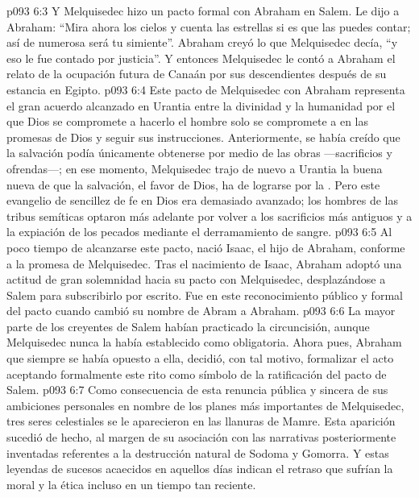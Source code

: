 \vs p093 6:3 Y Melquisedec hizo un pacto formal con Abraham en Salem. Le dijo a Abraham: “Mira ahora los cielos y cuenta las estrellas si es que las puedes contar; así de numerosa será tu simiente”. Abraham creyó lo que Melquisedec decía, “y eso le fue contado por justicia”. Y entonces Melquisedec le contó a Abraham el relato de la ocupación futura de Canaán por sus descendientes después de su estancia en Egipto.
\vs p093 6:4 \pc Este pacto de Melquisedec con Abraham representa el gran acuerdo alcanzado en Urantia entre la divinidad y la humanidad por el que Dios se compromete a hacerlo  el hombre solo se compromete a  en las promesas de Dios y seguir sus instrucciones. Anteriormente, se había creído que la salvación podía únicamente obtenerse por medio de las obras ---sacrificios y ofrendas---; en ese momento, Melquisedec trajo de nuevo a Urantia la buena nueva de que la salvación, el favor de Dios, ha de lograrse por la . Pero este evangelio de sencillez de fe en Dios era demasiado avanzado; los hombres de las tribus semíticas optaron más adelante por volver a los sacrificios más antiguos y a la expiación de los pecados mediante el derramamiento de sangre.
\vs p093 6:5 Al poco tiempo de alcanzarse este pacto, nació Isaac, el hijo de Abraham, conforme a la promesa de Melquisedec. Tras el nacimiento de Isaac, Abraham adoptó una actitud de gran solemnidad hacia su pacto con Melquisedec, desplazándose a Salem para subscribirlo por escrito. Fue en este reconocimiento público y formal del pacto cuando cambió su nombre de Abram a Abraham.
\vs p093 6:6 La mayor parte de los creyentes de Salem habían practicado la circuncisión, aunque Melquisedec nunca la había establecido como obligatoria. Ahora pues, Abraham que siempre se había opuesto a ella, decidió, con tal motivo, formalizar el acto aceptando formalmente este rito como símbolo de la ratificación del pacto de Salem.
\vs p093 6:7 Como consecuencia de esta renuncia pública y sincera de sus ambiciones personales en nombre de los planes más importantes de Melquisedec, tres seres celestiales se le aparecieron en las llanuras de Mamre. Esta aparición sucedió de hecho, al margen de su asociación con las narrativas posteriormente inventadas referentes a la destrucción natural de Sodoma y Gomorra. Y estas leyendas de sucesos acaecidos en aquellos días indican el retraso que sufrían la moral y la ética incluso en un tiempo tan reciente.
